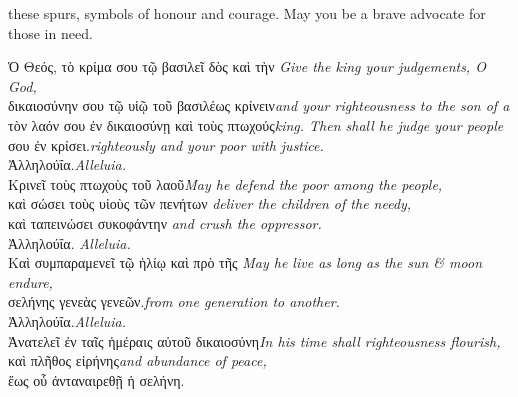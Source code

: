 {






 these spurs, symbols of honour and courage.
May you be a brave advocate for those in need.








\hellenic Ὁ Θεός, τὸ κρίμα σου τῷ βασιλεῖ δὸς καὶ τὴν
\hfill\normalfont\textit{Give the king your judgements, O God,}\\\hellenic
δικαιοσύνην σου τῷ υἱῷ τοῦ βασιλέως κρίνειν\hfill\normalfont\textit{and your righteousness to the son of a}\\\hellenic
τὸν λαόν σου ἐν δικαιοσύνῃ καὶ τοὺς πτωχούς\hfill\normalfont\textit{king. Then shall he judge your people}\\\hellenic
σου ἐν κρίσει.\hfill\normalfont\textit{righteously and your poor with justice.}\\\hellenic
 Ἀλληλούΐα.\hfill\normalfont\textit{Alleluia.}\\\hellenic
Κρινεῖ τοὺς πτωχοὺς τοῦ λαοῦ\hfill\normalfont\textit{May he defend the poor among the  people,}\\\hellenic
 καὶ σώσει
τοὺς υἱοὺς τῶν πενήτων 
\hfill\normalfont\textit{deliver the children of the needy,}\\
\hellenic καὶ ταπεινώσει συκοφάντην
\hfill\normalfont\textit{and crush the oppressor.}
\\\hellenic Ἀλληλούΐα. \hfill\normalfont\textit{Alleluia.}\\\hellenic
Καὶ συμπαραμενεῖ τῷ ἡλίῳ καὶ πρὸ τῆς\hfill\normalfont\textit{
May he live as long as the sun \& moon endure,}\\\hellenic
σελήνης γενεὰς γενεῶν.\hfill\normalfont\textit{from one generation to another.}\\\hellenic  Ἀλληλούΐα.\hfill\normalfont\textit{Alleluia.}\\\hellenic
Ἀνατελεῖ ἐν ταῖς ἡμέραις αὐτοῦ δικαιοσύνη\hfill\normalfont\textit{In his time shall righteousness flourish,}\\\hellenic
καὶ πλῆθος εἰρήνης\hfill\normalfont\textit{and abundance of peace,}\\\hellenic
ἕως οὗ ἀνταναιρεθῇ ἡ σελήνη.\hfill\normalfont\textit{
}}
